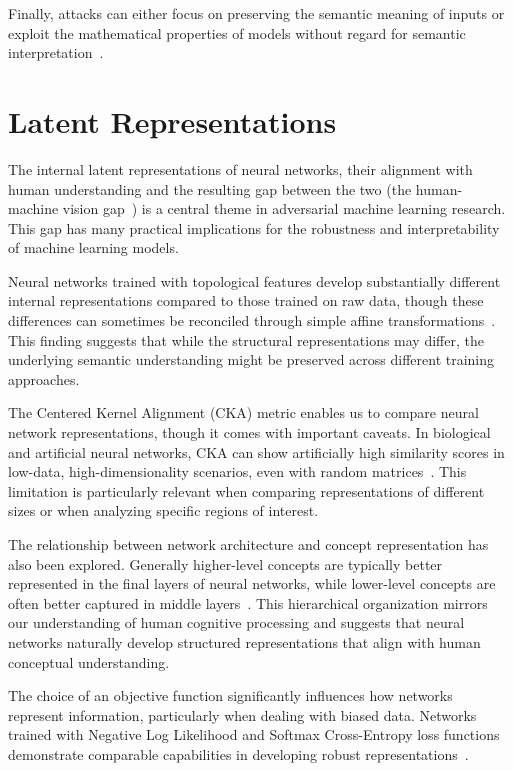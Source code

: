 \documentclass[a4paper, oneside]{discothesis}
\begin{document}
Finally, attacks can either focus on preserving the semantic meaning of inputs or exploit the mathematical properties of models without regard for semantic interpretation~\cite{browne2020semantics}.

\section{Latent Representations}

The internal latent representations of neural networks, their alignment with human understanding and the resulting gap between the two (the human-machine vision gap~\cite{geirhos2021partial}) is a central theme in adversarial machine learning research. This gap has many practical implications for the robustness and interpretability of machine learning models.

Neural networks trained with topological features develop substantially different internal representations compared to those trained on raw data, though these differences can sometimes be reconciled through simple affine transformations~\cite{mcguire2023neural}. This finding suggests that while the structural representations may differ, the underlying semantic understanding might be preserved across different training approaches.

The Centered Kernel Alignment (CKA) metric enables us to compare neural network representations, though it comes with important caveats. In biological and artificial neural networks, CKA can show artificially high similarity scores in low-data, high-dimensionality scenarios, even with random matrices~\cite{murphy2024correcting}. This limitation is particularly relevant when comparing representations of different sizes or when analyzing specific regions of interest.

The relationship between network architecture and concept representation has also been explored. Generally higher-level concepts are typically better represented in the final layers of neural networks, while lower-level concepts are often better captured in middle layers~\cite{Agafonov2022AnEO, Agafonov2022LocalizationOO}. This hierarchical organization mirrors our understanding of human cognitive processing and suggests that neural networks naturally develop structured representations that align with human conceptual understanding.

The choice of an objective function significantly influences how networks represent information, particularly when dealing with biased data. Networks trained with Negative Log Likelihood and Softmax Cross-Entropy loss functions demonstrate comparable capabilities in developing robust representations~\cite{bangaru2022interpreting}.
\end{document}
